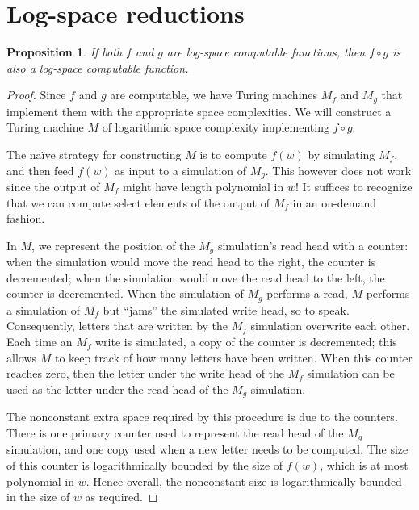 \documentclass[11pt,letterpaper]{article}
\newtheorem{proposition}{Proposition}
\begin{document}
\section{Log-space reductions}

\begin{proposition}
    If both $f$ and $g$ are log-space computable functions, then $f \circ g$ is
    also a log-space computable function.
\end{proposition}

\begin{proof}
    Since $f$ and $g$ are computable, we have Turing machines $M_f$ and $M_g$
    that implement them with the appropriate space complexities. We will
    construct a Turing machine $M$ of logarithmic space complexity implementing
    $f \circ g$.

    The na\"ive strategy for constructing $M$ is to compute $f(w)$ by
    simulating $M_f$, and then feed $f(w)$ as input to a simulation of $M_g$.
    This however does not work since the output of $M_f$ might have length
    polynomial in $w$! It suffices to recognize that we can compute select
    elements of the output of $M_f$ in an on-demand fashion.

    In $M$, we represent the position of the $M_g$ simulation's read head with
    a counter: when the simulation would move the read head to the right, the
    counter is decremented; when the simulation would move the read head to the
    left, the counter is decremented. When the simulation of $M_g$ performs a
    read, $M$ performs a simulation of $M_f$ but ``jams'' the simulated write
    head, so to speak. Consequently, letters that are written by the $M_f$
    simulation overwrite each other. Each time an $M_f$ write is simulated, a
    copy of the counter is decremented; this allows $M$ to keep track of how
    many letters have been written. When this counter reaches zero, then the
    letter under the write head of the $M_f$ simulation can be used as the
    letter under the read head of the $M_g$ simulation.

    The nonconstant extra space required by this procedure is due to the
    counters. There is one primary counter used to represent the read head of
    the $M_g$ simulation, and one copy used when a new letter needs to be
    computed. The size of this counter is logarithmically bounded by the size
    of $f(w)$, which is at most polynomial in $w$. Hence overall, the
    nonconstant size is logarithmically bounded in the size of $w$ as required.
\end{proof}
\end{document}
